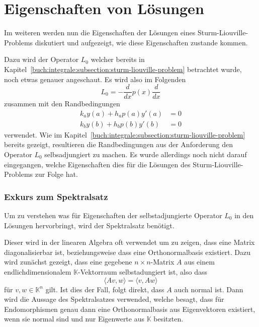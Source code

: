 %
%
%
\section{Eigenschaften von Lösungen
\label{sturmliouville:section:solution-properties}}

Im weiteren werden nun die Eigenschaften der Lösungen eines
Sturm-Liouville-Problems diskutiert und aufgezeigt, wie diese Eigenschaften
zustande kommen.

Dazu wird der Operator $L_0$ welcher bereits in 
Kapitel~\ref{buch:integrale:subsection:sturm-liouville-problem} betrachtet
wurde, noch etwas genauer angeschaut.
Es wird also im Folgenden
\[
    L_0
    =
    -\frac{d}{dx}p(x)\frac{d}{dx}
\]
zusammen mit den Randbedingungen
\[
    \begin{aligned}
        k_a y(a) + h_a p(a) y'(a) &= 0 \\
        k_b y(b) + h_b p(b) y'(b) &= 0
    \end{aligned}
\]
verwendet.
Wie im Kapitel~\ref{buch:integrale:subsection:sturm-liouville-problem} bereits 
gezeigt, resultieren die Randbedingungen aus der Anforderung den Operator $L_0$
selbsadjungiert zu machen.
Es wurde allerdings noch nicht darauf eingegangen, welche Eigenschaften dies
für die Lösungen des Sturm-Liouville-Problems zur Folge hat.

\subsubsection{Exkurs zum Spektralsatz}

Um zu verstehen was für Eigenschaften der selbstadjungierte Operator $L_0$ in 
den Lösungen hervorbringt, wird der Spektralsatz benötigt.

Dieser wird in der linearen Algebra oft verwendet um zu zeigen, dass eine Matrix
diagonalisierbar ist, beziehungsweise dass eine Orthonormalbasis existiert.
Dazu wird zunächst gezeigt, dass eine gegebene $n\times n$-Matrix $A$ aus einem
endlichdimensionalem $\mathbb{K}$-Vektorraum selbstadungiert ist, also dass
\[
    \langle Av, w \rangle
    =
    \langle v, Aw \rangle
\]
für $ v, w \in \mathbb{K}^n$ gilt.
Ist dies der Fall, folgt direkt, dass $A$ auch normal ist.
Dann wird die Aussage des Spektralsatzes
\cite{sturmliouville:spektralsatz-wiki} verwended, welche besagt, dass für
Endomorphismen genau dann eine Orthonormalbasis aus Eigenvektoren existiert,
wenn sie normal sind und nur Eigenwerte aus $\mathbb{K}$ besitzten.

